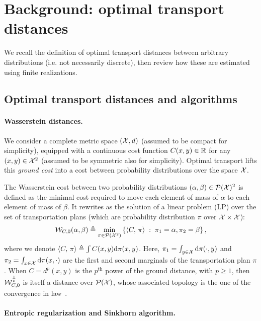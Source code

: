 \section{Background: optimal transport distances}

We recall the definition of optimal transport distances between arbitrary distributions (i.e. not necessarily discrete), then review how these are estimated using finite realizations.

\subsection{Optimal transport distances and algorithms}

\paragraph{Wasserstein distances.} 

We consider a complete metric space $(\mathcal{X},d)$ (assumed to be compact for simplicity), equipped
with a continuous cost function $C(x,y) \in \mathbb{R}$ for any $(x,y) \in \mathcal{X}^2$ (assumed to be symmetric also for simplicity). 
%
Optimal transport lifts this \textit{ground cost} into a cost between probability
distributions over the space $\mathcal{X}$. 
%

The Wasserstein cost between two probability distributions $(\alpha, \beta) \in \mathcal{P}(\mathcal{X})^2$ is defined as the minimal cost required to move each element of mass of $\alpha$ to each element of mass of $\beta$. It rewrites as the solution of a
linear problem (LP) over the set of transportation plans (which are probability distribution $\pi$ over $\mathcal{X} \times \mathcal{X}$):
\begin{equation}\label{eq:wass}
    \mathcal{W}_{C,0}(\alpha, \beta) \triangleq 
    \min_{\pi \in \mathcal{P}(\mathcal{X}^2)}
    \left\{ 
    	\langle C,\,\pi\rangle
	 \;:\;  \pi_1=\alpha, \pi_2=\beta \right\},
\end{equation}
where we denote $\langle C,\,\pi\rangle \triangleq \int C(x,y) \textrm{d}\pi(x,y)$. Here,  
$\pi_1 = \int_{y\in \mathcal{X}} \textrm{d} \pi(\cdot, y)$ and $\pi_2 = \int_{x\in \mathcal{X}} \textrm{d}
\pi(x, \cdot)$ are the first and second marginals of the transportation plan $\pi$. 
%
When $C=d^p(x,y)$ is the $p^{\text{th}}$ power of the ground distance, with $p
\geq 1$, then $\mathcal{W}_{C,0}^{\frac{1}{p}}$ is itself a distance over $\mathcal{P}(\mathcal{X})$, whose
associated topology is the one of the convergence in
law~\cite{santambrogio2015optimal}.

\paragraph{Entropic regularization and Sinkhorn algorithm.} 

